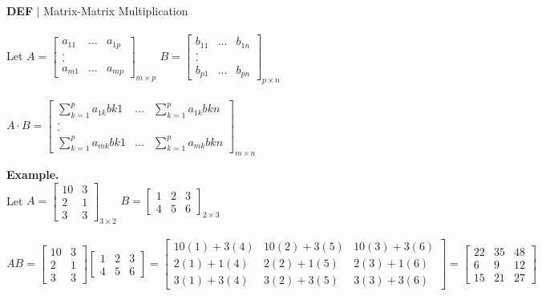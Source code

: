 \documentclass [12pt]{article}
\begin{document}
\begin{framed}
\noindent\textbf{DEF} $|$ Matrix-Matrix Multiplication\\\\
Let $A=\begin{bmatrix}
a_{11}&...&a_{1p}\\
.\\
.\\
a_{m1}&...&a_{mp}
\end{bmatrix}_{m\times p}$\indent
$B=\begin{bmatrix}
b_{11}&...&b_{1n}\\
.\\
.\\
b_{p1}&...&b_{pn}
\end{bmatrix}_{p\times n}$\\\\
$A\cdot B=\begin{bmatrix}
\sum\limits_{k=1}^pa_{1k}b{k1}&...&\sum\limits_{k=1}^pa_{1k}b{kn}\\
.\\
.\\
\sum\limits_{k=1}^pa_{mk}b{k1}&...&\sum\limits_{k=1}^pa_{mk}b{kn}
\end{bmatrix}_{m\times n}$
\end{framed}
\noindent\textbf{Example.}\\
Let $A=\begin{bmatrix}
10&3\\
2&1\\
3&3
\end{bmatrix}_{3\times2}$\indent
$B=\begin{bmatrix}
1&2&3\\
4&5&6
\end{bmatrix}_{2\times3}$\\\\
$AB=\begin{bmatrix}
10&3\\
2&1\\
3&3
\end{bmatrix}\begin{bmatrix}
1&2&3\\
4&5&6
\end{bmatrix}=\begin{bmatrix}
10(1)+3(4)&10(2)+3(5)&10(3)+3(6)\\
2(1)+1(4)&2(2)+1(5)&2(3)+1(6)\\
3(1)+3(4)&3(2)+3(5)&3(3)+3(6)
\end{bmatrix}=\begin{bmatrix}
22&35&48\\
6&9&12\\
15&21&27
\end{bmatrix}$
\end{document}

